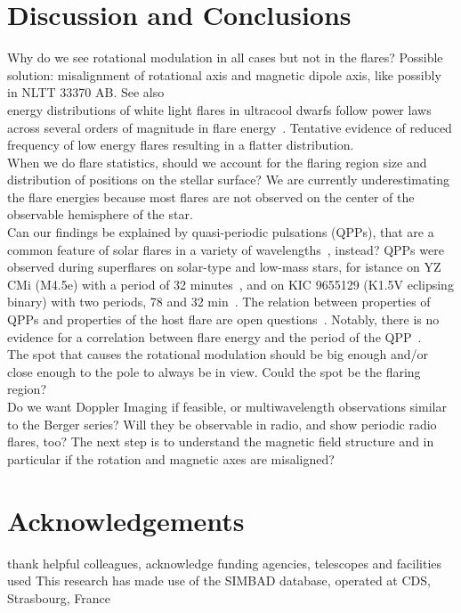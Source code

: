 \documentclass[fleqn,usenatbib,letters]{mnras}%
\begin{document}
\section{Discussion and Conclusions}
\label{sec:summary}
Why do we see rotational modulation in all cases but not in the flares? Possible solution: misalignment of rotational axis and magnetic dipole axis, like possibly in 	NLTT 33370 AB\citep{mclean2011}. See also ~\citep{pineda2017}
\\
energy distributions of white light flares in ultracool dwarfs follow power laws across several orders of magnitude in flare energy~\citep{gizis2017b, paudel2018}. Tentative evidence of reduced frequency of low energy flares resulting in a flatter distribution.
\\
When we do flare statistics, should we account for the flaring region size  and distribution of positions on the stellar surface? We are currently underestimating the flare energies because most flares are not observed on the center of the observable hemisphere of the star.
\\
Can our findings be explained by quasi-periodic pulsations (QPPs), that are a common feature of solar flares in a variety of wavelengths~\citep{pugh2016}, instead?
QPPs were observed during superflares on solar-type and low-mass stars, for istance on YZ CMi (M4.5e) with a period of 32 minutes~\citep{anfinogentov2013}, and on KIC 9655129 (K1.5V eclipsing binary) with two periods, 78 and 32 min~\citep{pugh2015}.
The relation between properties of QPPs and properties of the host flare are open questions~\citep{mclaughlin2018}. Notably, there is no evidence for a correlation between flare energy and the period of the QPP~\citep{pugh2016}.
\\
The spot that causes the rotational modulation should be big enough and/or close enough to the pole to always be in view. Could the spot be the flaring region?
\\
Do we want Doppler Imaging if feasible, or multiwavelength observations similar to
the Berger series? Will they be observable in radio, and show periodic radio flares, too? The next step is to understand the magnetic field structure and in particular if the rotation and magnetic axes are misaligned?
\section*{Acknowledgements}

thank helpful colleagues, acknowledge funding agencies, telescopes and facilities used
This research has made use of the SIMBAD database,
operated at CDS, Strasbourg, France~\citep{wenger2000}
\end{document}
